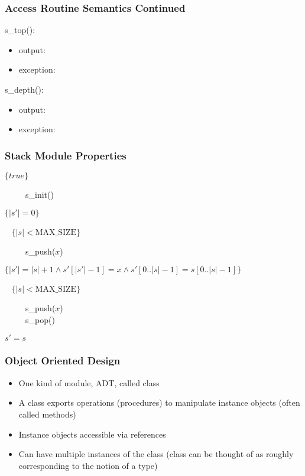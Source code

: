 \documentclass[t,12pt,numbers,fleqn,handout]{beamer}
\begin{document}
\begin{frame}
\frametitle{Access Routine Semantics Continued}

\noindent s\_top():
\begin{itemize}
\item output: 
\item exception: 
\end{itemize}

\noindent s\_depth():
\begin{itemize}
\item output: 
\item exception: 
\end{itemize}

\end{frame}


\begin{frame}
\frametitle{Stack Module Properties}

$\{ \mathit{true} \}$

~~~~~s\_init()

$\{ | s' | = 0 \}$

~\newline
$\{ | s | < \mbox{MAX\_SIZE} \}$

~~~~~s\_push($x$)

$\{ | s' | = | s | + 1 \wedge s'[|s'| - 1] = x \wedge s'[0..|s|-1] = s[0..|s|-1] \}$

~\newline
$\{ |s| < \mbox{MAX\_SIZE} \}$

~~~~~s\_push($x$)\\
~~~~~s\_pop()

$s' = s$

\end{frame}


\begin{frame}
\frametitle{Object Oriented Design}
\begin{itemize}
\item One kind of module, ADT, called class
\item A class exports operations (procedures) to manipulate instance objects (often called methods)
\item Instance objects accessible via references
\item Can have multiple instances of the class (class can be thought of as roughly corresponding to the notion of a type)
\end{itemize}
\end{frame}
\end{document}
